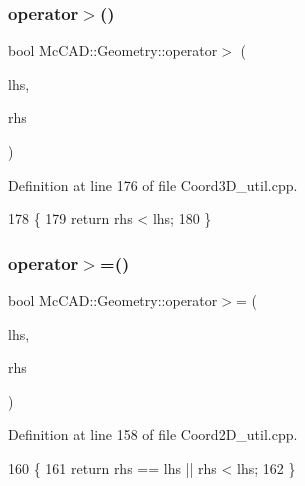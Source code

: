 \subsubsection{\texorpdfstring{operator$>$()}{operator>()}\hspace{0.1cm}{\footnotesize\ttfamily [3/3]}}
{\footnotesize\ttfamily bool Mc\+C\+A\+D\+::\+Geometry\+::operator$>$ (\begin{DoxyParamCaption}\item[{const \hyperlink{classMcCAD_1_1Geometry_1_1Coord3D}{Coord3D} \&}]{lhs,  }\item[{const \hyperlink{classMcCAD_1_1Geometry_1_1Coord3D}{Coord3D} \&}]{rhs }\end{DoxyParamCaption})}



Definition at line 176 of file Coord3\+D\+\_\+util.\+cpp.


\begin{DoxyCode}
178                            \{
179     \textcolor{keywordflow}{return} rhs < lhs;
180 \}
\end{DoxyCode}
\mbox{\label{namespaceMcCAD_1_1Geometry_ab5170e48d3483ba44824eded75d5ae69}} 
\subsubsection{\texorpdfstring{operator$>$=()}{operator>=()}\hspace{0.1cm}{\footnotesize\ttfamily [1/3]}}
{\footnotesize\ttfamily bool Mc\+C\+A\+D\+::\+Geometry\+::operator$>$= (\begin{DoxyParamCaption}\item[{const \hyperlink{classMcCAD_1_1Geometry_1_1Coord2D}{Coord2D} \&}]{lhs,  }\item[{const \hyperlink{classMcCAD_1_1Geometry_1_1Coord2D}{Coord2D} \&}]{rhs }\end{DoxyParamCaption})}



Definition at line 158 of file Coord2\+D\+\_\+util.\+cpp.


\begin{DoxyCode}
160                            \{
161     \textcolor{keywordflow}{return} rhs == lhs || rhs < lhs;
162 \}
\end{DoxyCode}
\mbox{\label{namespaceMcCAD_1_1Geometry_a903001ae7c418a4cfd2b5839b8a47d72}} 
